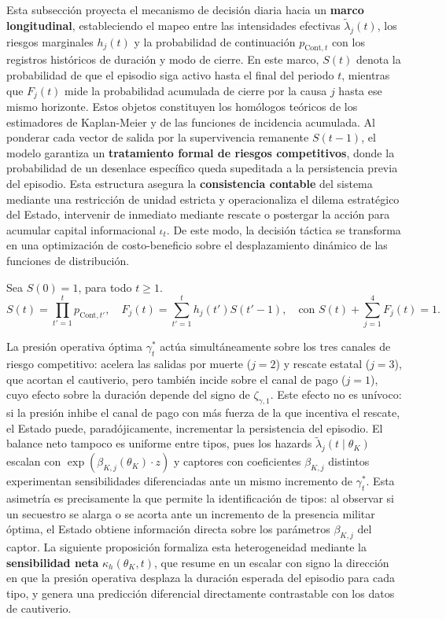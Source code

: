 \documentclass[12pt]{article}
\providecommand{\textcite}{\citet}
\theoremstyle{definition}
\theoremstyle{remark}
\newcommand{\1}{\mathbf{1}}
\begin{document}
Esta subsección proyecta el mecanismo de decisión diaria hacia un \textbf{marco longitudinal}, estableciendo el mapeo entre las intensidades efectivas $\tilde{\lambda}_j(t)$, los riesgos marginales $h_j(t)$ y la probabilidad de continuación $p_{\mathrm{Cont},t}$ con los registros históricos de duración y modo de cierre. En este marco, $S(t)$ denota la probabilidad de que el episodio siga activo hasta el final del periodo $t$, mientras que $F_j(t)$ mide la probabilidad acumulada de cierre por la causa $j$ hasta ese mismo horizonte. Estos objetos constituyen los homólogos teóricos de los estimadores de Kaplan-Meier \textcite{KaplanMeier1958} y de las funciones de incidencia acumulada. Al ponderar cada vector de salida por la supervivencia remanente $S(t-1)$, el modelo garantiza un \textbf{tratamiento formal de riesgos competitivos}, donde la probabilidad de un desenlace específico queda supeditada a la persistencia previa del episodio. Esta estructura asegura la \textbf{consistencia contable} del sistema mediante una restricción de unidad estricta y operacionaliza el dilema estratégico del Estado, intervenir de inmediato mediante rescate o postergar la acción para acumular capital informacional $\iota_t$. De este modo, la decisión táctica se transforma en una optimización de costo-beneficio sobre el desplazamiento dinámico de las funciones de distribución.

Sea $S(0)=1$, para todo $t \ge 1$.
\begin{equation}
\label{eq:longitudinal-system}
S(t) = \prod_{t'=1}^{t} p_{\mathrm{Cont},t'}, \quad F_j(t) = \sum_{t'=1}^{t} h_j(t')S(t'-1), \quad \text{con } S(t) + \sum_{j=1}^{4} F_j(t) = 1.
\end{equation}


La presión operativa óptima $\gamma_t^\ast$ actúa simultáneamente sobre los tres canales de riesgo competitivo: acelera las salidas por muerte ($j=2$) y rescate estatal ($j=3$), que acortan el cautiverio, pero también incide sobre el canal de pago ($j=1$), cuyo efecto sobre la duración depende del signo de $\zeta_{\gamma,1}$. Este efecto no es unívoco: si la presión inhibe el canal de pago con más fuerza de la que incentiva el rescate, el Estado puede, paradójicamente, incrementar la persistencia del episodio. El balance neto tampoco es uniforme entre tipos, pues los hazards $\tilde{\lambda}_j(t\mid\theta_K)$ escalan con $\exp(\beta_{K,j}(\theta_K)\cdot z)$ y captores con coeficientes $\beta_{K,j}$ distintos experimentan sensibilidades diferenciadas ante un mismo incremento de $\gamma_t^\ast$. Esta asimetría es precisamente la que permite la identificación de tipos: al observar si un secuestro se alarga o se acorta ante un incremento de la presencia militar óptima, el Estado obtiene información directa sobre los parámetros $\beta_{K,j}$ del captor. La siguiente proposición formaliza esta heterogeneidad mediante la \textbf{sensibilidad neta} $\kappa_h(\theta_K,t)$, que resume en un escalar con signo la dirección en que la presión operativa desplaza la duración esperada del episodio para cada tipo, y genera una predicción diferencial directamente contrastable con los datos de cautiverio.
\end{document}
